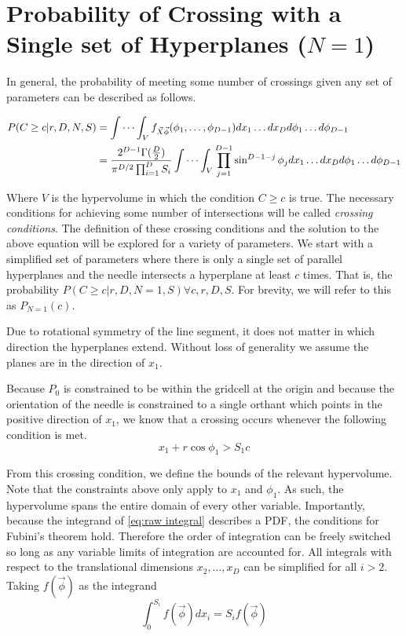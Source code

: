 \documentclass{article}
\begin{document}
\section{Probability of Crossing with a Single set of Hyperplanes ($N=1$)} \label{s:n=1}
In general, the probability of meeting some number of crossings given any set of parameters can be described as follows.

\begin{align} 
	P(C\ge c|r, D, N, S)&=\idotsint_V f_{\vec{X}\vec\phi}(\phi_1,\hdots,\phi_{D-1})dx_1 \hdots dx_D d\phi_1 \hdots d\phi_{D-1} \label{eq:raw integral}\\
	&= \frac{2^{D-1}\Gamma(\frac{D}{2})}{\pi^{D/2}\prod_{i=1}^DS_i} \idotsint_V \prod_{j=1}^{D-1}\sin^{D-1-j}\phi_j dx_1\hdots dx_D d\phi_1 \hdots d\phi_{D-1} \label{eq:volume integral}
\end{align}

Where $V$ is the hypervolume in which the condition $C\ge c$ is true. The necessary conditions for achieving some number of intersections
will be called \emph{crossing conditions}. The definition of these crossing conditions and the solution to the above equation will be
explored for a variety of parameters.
We start with a simplified set of parameters where there is only a single set of parallel hyperplanes and the needle intersects a
hyperplane at least $c$ times. That is, the probability $P(C\ge c | r, D, N=1, S) \forall c, r, D, S$. For brevity, we will refer to this
as $P_{N=1}(c)$.

Due to rotational symmetry of the line segment, it does not matter in which direction the hyperplanes extend. Without loss of
generality we assume the planes are in the direction of $x_1$.

Because $P_0$ is constrained to be within the gridcell at the origin and because the orientation of the needle is constrained to a single
orthant which points in the positive direction of $x_1$, we know that a crossing occurs whenever the following condition is met.
\begin{equation}
	x_1 + r\cos{\phi_1} > S_1c
\end{equation}

From this crossing condition, we define the bounds of the relevant hypervolume. Note that the constraints above only apply to $x_1$ and
$\phi_1$. As such, the hypervolume spans the entire domain of every other variable. Importantly, because the integrand of \ref{eq:raw integral}
describes a PDF, the conditions for Fubini's theorem hold. Therefore the order of integration can be freely switched so long as any variable
limits of integration are accounted for. All integrals with respect to the translational dimensions $x_2, \hdots, x_D$ can be simplified
for all $i>2$. Taking $f(\vec\phi)$ as the integrand
\begin{equation}
	\int_0^{S_i}f(\vec\phi)dx_i = S_if(\vec\phi) \label{eq:irrelevant translational}
\end{equation}
\end{document}
